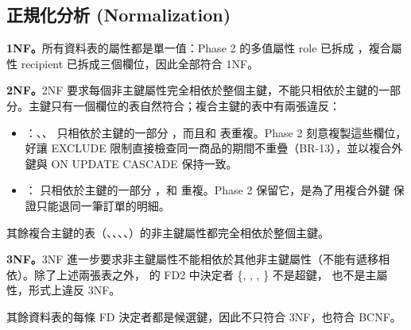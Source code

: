\subsection{正規化分析 (Normalization)}

\textbf{1NF。}所有資料表的屬性都是單一值：Phase 2 的多值屬性 role 已拆成 ，複合屬性 recipient 已拆成三個欄位，因此全部符合 1NF。

\textbf{2NF。}2NF 要求每個非主鍵屬性完全相依於整個主鍵，不能只相依於主鍵的一部分。主鍵只有一個欄位的表自然符合；複合主鍵的表中有兩張違反：

\begin{itemize}[itemsep=0.2em]
  \item {}：、、 只相依於主鍵的一部分 ，而且和  表重複。Phase 2 刻意複製這些欄位，好讓 EXCLUDE 限制直接檢查同一商品的期間不重疊（BR-13），並以複合外鍵與 ON UPDATE CASCADE 保持一致。
  \item {}： 只相依於主鍵的一部分 ，和  重複。Phase 2 保留它，是為了用複合外鍵  保證只能退同一筆訂單的明細。
\end{itemize}

其餘複合主鍵的表（、、、、）的非主鍵屬性都完全相依於整個主鍵。

\textbf{3NF。}3NF 進一步要求非主鍵屬性不能相依於其他非主鍵屬性（不能有遞移相依）。除了上述兩張表之外， 的 FD2 中決定者 \{, , , \} 不是超鍵， 也不是主屬性，形式上違反 3NF。

其餘資料表的每條 FD 決定者都是候選鍵，因此不只符合 3NF，也符合 BCNF。

